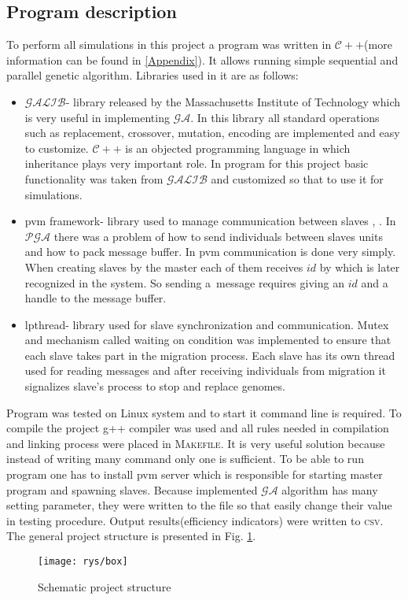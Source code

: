 \subsection{Program description}
To perform all simulations in this project a program was written in
$\mathcal{C++}$(more information can be found in \ref{Appendix}). It allows running simple sequential and parallel genetic
algorithm. Libraries used in it are as follows:
\begin{itemize}
	\item $\mathcal{GALIB}$- library released by the Massachusetts Institute
		of Technology which is very useful in implementing $\mathcal{GA}$. In
		this library all standard operations such as replacement, crossover,
		mutation, encoding are implemented and easy to customize.
		$\mathcal{C++}$ is an objected programming language in which inheritance
		plays very important role. In program for this project basic
		functionality was taken from $\mathcal{GALIB}$ and customized so that to
		use it for simulations.
	\item pvm framework- library used to manage communication between slaves \cite{bib3}, \cite{bib13}.
		In $\mathcal{PGA}$ there was a problem of how to send individuals between
		slaves units and how to pack message buffer. In pvm communication is
		done very simply. When creating slaves by the master each of them
		receives $id$ by which is later recognized in the system. So sending 
		a~message requires giving an $id$ and a handle to the message buffer. 
	\item lpthread- library used for slave synchronization and communication.
		Mutex and mechanism called waiting on condition was implemented to
		ensure that each slave takes part in the migration process. Each slave has
		its own thread used for reading messages and after receiving
		individuals from migration it signalizes slave's process to stop and
		replace genomes. 
\end{itemize}
Program was tested on Linux system and to start it command line is required.  To
compile the project g++ compiler was used and all rules needed in compilation
and linking process were placed in \textsc{Makefile}. It is very useful solution
because instead of writing many command only one is sufficient. To be able to
run program one has to install pvm server which is responsible for starting
master program and spawning slaves. Because implemented $\mathcal{GA}$ algorithm
has many setting parameter, they were written to the file so that easily
change their value in testing procedure. Output results(efficiency indicators) were written to
\textsc{csv}. The
general project structure is presented in Fig. \ref{fig:setting}. 
\pagebreak
\begin{figure}[!htpb]
	\begin{center}
		\texttt{[image: rys/box]}
	\end{center}
	\caption{Schematic project structure}
	\label{fig:setting}
\end{figure}


